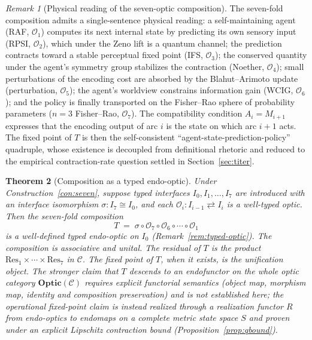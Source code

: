 \documentclass[11pt,a4paper]{article}
\theoremstyle{plain}
\newtheorem{theorem}{Theorem}[section]
\theoremstyle{definition}
\theoremstyle{remark}
\newtheorem{remark}[theorem]{Remark}
\newcommand{\OO}{\mathcal{O}}
\newcommand{\CC}{\mathcal{C}}
\newcommand{\Optic}{\mathbf{Optic}}
\begin{document}
\begin{remark}[Physical reading of the seven-optic composition]
\label{rem:optics-physical}
The seven-fold composition admits a single-sentence physical reading:
a self-maintaining agent (RAF, $\OO_1$) computes its next internal
state by predicting its own sensory input (RPSI, $\OO_2$), which under
the Zeno lift is a quantum channel; the prediction contracts toward a
stable perceptual fixed point (IFS, $\OO_3$); the conserved quantity
under the agent's symmetry group stabilizes the contraction (Noether,
$\OO_4$); small perturbations of the encoding cost are absorbed by the
Blahut--Arimoto update (perturbation, $\OO_5$); the agent's worldview
constrains information gain (WCIG, $\OO_6$); and the policy is finally
transported on the Fisher--Rao sphere of probability parameters
($n=3$ Fisher--Rao, $\OO_7$). The compatibility condition
$A_i = M_{i+1}$ expresses that the encoding output of arc $i$ is the
state on which arc $i+1$ acts. The fixed point of $T$ is then the
self-consistent ``agent-state-prediction-policy'' quadruple, whose
existence is decoupled from definitional rhetoric and reduced to the
empirical contraction-rate question settled in
Section~\ref{sec:titer}.
\end{remark}

\begin{theorem}[Composition as a typed endo-optic]\label{thm:composition}
Under Construction~\ref{con:seven}, suppose typed interfaces
$I_0, I_1, \ldots, I_7$ are introduced with an interface isomorphism
$\sigma : I_7 \cong I_0$, and each $\OO_i : I_{i-1} \rightleftarrows I_i$
is a well-typed optic. Then the seven-fold composition
\begin{equation}\label{eq:comp}
  T \;=\; \sigma \circ \OO_7 \circ \OO_6 \circ \cdots \circ \OO_1
\end{equation}
is a well-defined \emph{typed endo-optic} on $I_0$ (Remark~\ref{rem:typed-optic}).
The composition is associative and unital. The residual of $T$ is the
product $\mathrm{Res}_1 \times \cdots \times \mathrm{Res}_7$ in $\CC$.
The fixed point of $T$, when it exists, is the \emph{unification object}.
The stronger claim that $T$ descends to an endofunctor on the whole
optic category $\Optic(\CC)$ requires explicit functorial semantics
(object map, morphism map, identity and composition preservation) and is
not established here; the operational fixed-point claim is instead
realized through a realization functor $R$ from endo-optics to
endomaps on a complete metric state space $S$ and proven under an
explicit Lipschitz contraction bound (Proposition~\ref{prop:qbound}).
\end{theorem}
\end{document}
